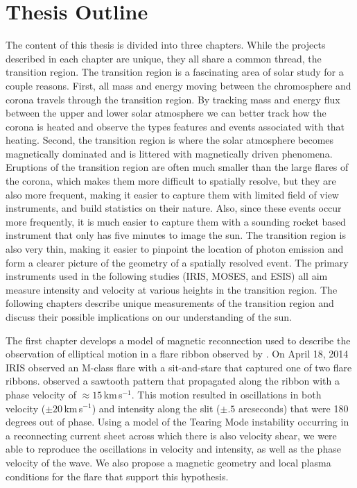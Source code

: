 \section{Thesis Outline}
The content of this thesis is divided into three chapters.  
While the projects described in each chapter are unique, they all share a common thread, the transition region.
The transition region is a fascinating area of solar study for a couple reasons.
First, all mass and energy moving between the chromosphere and corona travels through the transition region.
By tracking mass and energy flux between the upper and lower solar atmosphere we can better track how the corona is heated and observe the types features and events associated with that heating.
Second, the transition region is where the solar atmosphere becomes magnetically dominated and is littered with magnetically driven phenomena.
Eruptions of the transition region are often much smaller than the large flares of the corona, which makes them more difficult to spatially resolve, but they are also more frequent, making it easier to capture them with limited field of view instruments, and build statistics on their nature.
Also, since these events occur more frequently, it is much easier to capture them with a sounding rocket based instrument that only has five minutes to image the sun.
The transition region is also very thin, making it easier to pinpoint the location of photon emission and form a clearer picture of the geometry of a spatially resolved event. 
The primary instruments used in the following studies (IRIS, MOSES, and ESIS) all aim  measure intensity and velocity at various heights in the transition region.
The following chapters describe unique measurements of the transition region and discuss their possible implications on our understanding of the sun.

The first chapter develops a model of magnetic reconnection used to describe the observation of elliptical motion in a flare ribbon observed by \citet{Brannon2015}.
On April 18, 2014 IRIS observed an M-class flare with a sit-and-stare that captured one of two flare ribbons.
\citet{Brannon2015} observed a sawtooth pattern that propagated along the ribbon with a phase velocity of $\approx15$\,km\,s$^{-1}$.
This motion resulted in oscillations in both velocity ($\pm20$\,km\,s$^{-1}$) and intensity along the slit ($\pm.5$ arcseconds) that were 180 degrees out of phase.
Using a model of the Tearing Mode instability \citep{FKR} occurring in a reconnecting current sheet across which there is also velocity shear, we were able to reproduce the oscillations in velocity and intensity, as well as the phase velocity of the wave.
We also propose a magnetic geometry and local plasma conditions for the flare that support this hypothesis.

